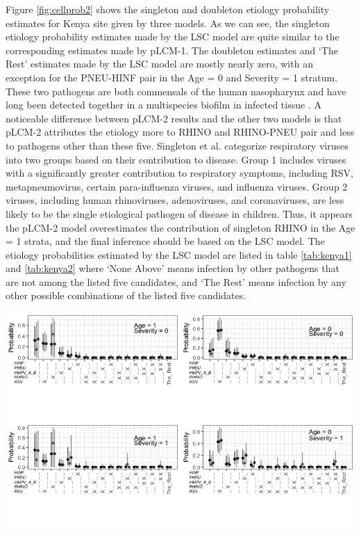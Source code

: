 \documentclass[11 pt, a4paper]{article}  %
\begin{document}
Figure \ref{fig:cellprob2} shows the singleton and doubleton etiology probability estimates for Kenya site given by three models. As we can see, the singleton etiology probability estimates made by the LSC model are quite similar to the corresponding estimates made by pLCM-1. The doubleton estimates and `The Rest' estimates made by the LSC model are mostly nearly zero, with an exception for the PNEU-HINF pair in the Age = 0 and Severity = 1 stratum. These two pathogens are both commensals of the human nasopharynx and have long been detected together in a multispecies biofilm in infected tissue \cite{tikhomirova2013haemophilus}. A noticeable difference between pLCM-2 results and the other two models is that pLCM-2 attributes the etiology more to RHINO and RHINO-PNEU pair and less to pathogens other than these five. Singleton et al. \cite{singleton2010viral} categorize respiratory viruses into two groups based on their contribution to disease. Group 1 includes viruses with a significantly greater contribution to respiratory symptoms, including RSV, metapneumovirus, certain para-influenza viruses, and influenza viruses. Group 2 viruses, including human rhinoviruses, adenoviruses, and coronaviruses, are less likely to be the single etiological pathogen of disease in children. Thus, it appears the pLCM-2 model overestimates the contribution of singleton RHINO in the Age = 1 strata, and the final inference should be based on the LSC model. The etiology probabilities estimated by the LSC model are listed in table \ref{tab:kenya1} and \ref{tab:kenya2} where `None Above' means infection by other pathogens that are not among the listed five candidates, and `The Rest' means infection by any other possible combinations of the listed five candidates.  



\begin{center}
\includegraphics[scale=0.55]{Kenya_By_Combination.png}
\label{fig:cellprob2}
\end{center}
\end{document}
